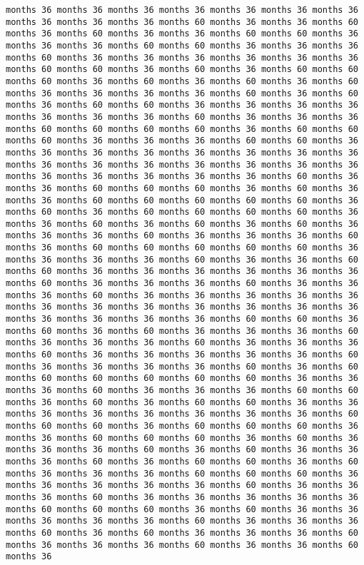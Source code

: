\documentclass[11pt]{article}
\begin{document}
\begin{Verbatim}[commandchars=\\\{\}, frame=single, framerule=2mm, rulecolor=\color{outerrorbackground}]
months 36 months 36 months 36 months 36 months 36 months 36 months 36 months 36 months 36 months 36 months 60 months 36 months 36 months 60 months 36 months 60 months 36 months 36 months 60 months 60 months 36 months 36 months 36 months 60 months 60 months 36 months 36 months 36 months 60 months 36 months 36 months 36 months 36 months 36 months 36 months 60 months 60 months 36 months 60 months 36 months 60 months 60 months 60 months 36 months 60 months 36 months 60 months 36 months 60 months 36 months 36 months 36 months 36 months 60 months 36 months 60 months 36 months 60 months 60 months 36 months 36 months 36 months 36 months 36 months 36 months 36 months 60 months 36 months 36 months 36 months 60 months 60 months 60 months 60 months 36 months 60 months 60 months 60 months 36 months 36 months 36 months 60 months 60 months 36 months 36 months 36 months 36 months 36 months 36 months 36 months 36 months 36 months 36 months 36 months 36 months 36 months 36 months 36 months 36 months 36 months 36 months 36 months 36 months 60 months 36 months 36 months 60 months 60 months 60 months 36 months 60 months 36 months 36 months 60 months 60 months 60 months 60 months 60 months 36 months 60 months 36 months 60 months 60 months 60 months 60 months 36 months 36 months 60 months 36 months 60 months 36 months 60 months 36 months 36 months 36 months 60 months 36 months 36 months 36 months 60 months 36 months 60 months 60 months 60 months 60 months 60 months 36 months 36 months 36 months 36 months 60 months 36 months 36 months 60 months 60 months 36 months 36 months 36 months 36 months 36 months 36 months 60 months 36 months 36 months 36 months 60 months 36 months 36 months 36 months 60 months 36 months 36 months 36 months 36 months 36 months 36 months 36 months 36 months 36 months 36 months 36 months 36 months 36 months 36 months 36 months 36 months 60 months 60 months 36 months 60 months 36 months 60 months 36 months 36 months 36 months 60 months 36 months 36 months 36 months 60 months 36 months 36 months 36 months 60 months 36 months 36 months 36 months 36 months 36 months 60 months 36 months 36 months 36 months 36 months 60 months 36 months 60 months 60 months 60 months 60 months 60 months 60 months 36 months 36 months 36 months 60 months 36 months 36 months 36 months 60 months 60 months 36 months 60 months 36 months 60 months 60 months 36 months 36 months 36 months 36 months 36 months 36 months 36 months 36 months 60 months 60 months 60 months 36 months 60 months 60 months 60 months 36 months 36 months 60 months 60 months 60 months 36 months 60 months 36 months 36 months 36 months 60 months 36 months 60 months 36 months 36 months 36 months 60 months 36 months 60 months 60 months 36 months 60 months 36 months 36 months 36 months 60 months 60 months 60 months 36 months 36 months 36 months 36 months 36 months 60 months 36 months 36 months 36 months 60 months 36 months 36 months 36 months 36 months 36 months 60 months 60 months 60 months 36 months 60 months 36 months 36 months 36 months 36 months 36 months 60 months 36 months 36 months 36 months 60 months 36 months 60 months 36 months 36 months 36 months 60 months 36 months 36 months 36 months 60 months 36 months 36 months 60 months 36 
\end{Verbatim}
\end{document}
